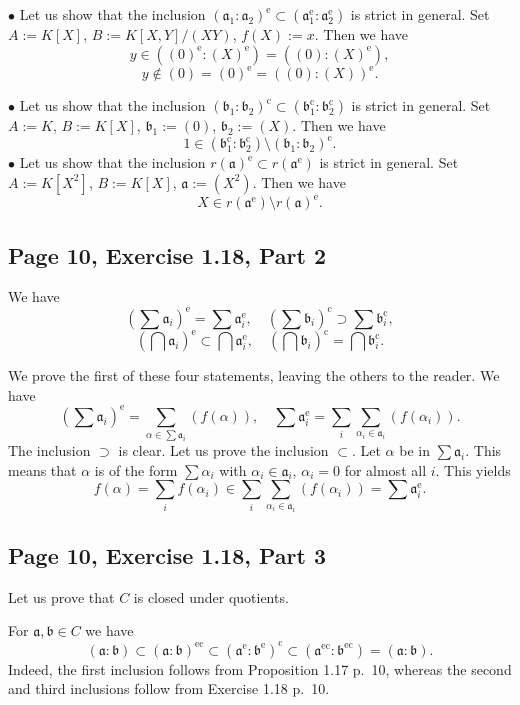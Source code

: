 \documentclass[parskip=half,fontsize=12pt]{scrartcl}%
\newcommand{\oo}{\operatorname}\newcommand{\ooo}{\operatorname*}
\newcommand{\mf}{\mathfrak}
\newcommand{\aaa}{\mf a}
\newcommand{\bbb}{\mf b}
\newcommand{\bu}{\bullet}
\begin{document}
$\bu$ Let us show that the inclusion $(\mf a_1:\mf a_2)^{\oo e}\subset(\mf a_1^{\oo e}:\mf a_2^{\oo e})$ is strict in general. Set $A:=K[X]$, $B:=K[X,Y]/(XY)$, $f(X):=x$. Then we have 
$$
y\in((0)^{\oo e}:(X)^{\oo e})=((0):(X)^{\oo e}),
$$ 
$$y\notin(0)=(0)^{\oo e}=((0):(X))^{\oo e}.$$

$\bu$ Let us show that the inclusion $(\bbb_1:\bbb_2)^{\oo c}\subset(\bbb_1^{\oo c}:\bbb_2^{\oo c})$ is strict in general. Set $A:=K$, $B:=K[X]$, $\bbb_1:=(0)$, $\bbb_2:=(X)$. Then we have 
$$
1\in(\bbb_1^{\oo c}:\bbb_2^{\oo c})\setminus(\bbb_1:\bbb_2)^{\oo c}.
$$
$\bu$ Let us show that the inclusion $r(\mf a)^{\oo e}\subset r(\mf a^{\oo e})$ is strict in general. Set $A:=K[X^2]$, $B:=K[X]$, $\mf a:=(X^2)$. Then we have 
$$
X\in r(\mf a^{\oo e})\setminus r(\mf a)^{\oo e}.
$$

\subsection{Page 10, Exercise 1.18, Part 2}%

We have 
$$
\left(\sum\mf a_i\right)^{\oo e}=\sum\mf a_i^{\oo e},\quad\left(\sum\bbb_i\right)^{\oo c}\supset\sum\bbb_i^{\oo c},
$$
$$
\left(\bigcap\mf a_i\right)^{\oo e}\subset\bigcap\mf a_i^{\oo e},\quad\left(\bigcap\bbb_i\right)^{\oo c}=\bigcap\bbb_i^{\oo c}.
$$

We prove the first of these four statements, leaving the others to the reader. We have 
$$
\left(\sum\mf a_i\right)^{\oo e}=\sum_{\alpha\in\sum\mf a_i}(f(\alpha)),\quad\sum\mf a_i^{\oo e}=\sum_i\sum_{\alpha_i\in\mf a_i}(f(\alpha_i)).
$$ 
The inclusion $\supset$ is clear. Let us prove the inclusion $\subset$. Let $\alpha$ be in $\sum\mf a_i$. This means that $\alpha$ is of the form $\sum\alpha_i$ with $\alpha_i\in\mf a_i$, $\alpha_i=0$ for almost all $i$. This yields 
$$
f(\alpha)=\sum_if(\alpha_i)\in\sum_i\sum_{\alpha_i\in\mf a_i}(f(\alpha_i))=\sum\mf a_i^{\oo e}.
$$ 

\subsection{Page 10, Exercise 1.18, Part 3}%

Let us prove that $C$ is closed under quotients. 

For $\aaa,\bbb\in C$ we have
$$
(\aaa:\bbb)\subset(\aaa:\bbb)^{\oo{ec}}\subset(\aaa^{\oo e}:\bbb^{\oo e})^{\oo c}\subset(\aaa^{\oo{ec}}:\bbb^{\oo{ec}})=(\aaa:\bbb).
$$ 
Indeed, the first inclusion follows from Proposition 1.17 p.~10, whereas the second and third inclusions follow from Exercise 1.18 p.~10. 
\end{document}
